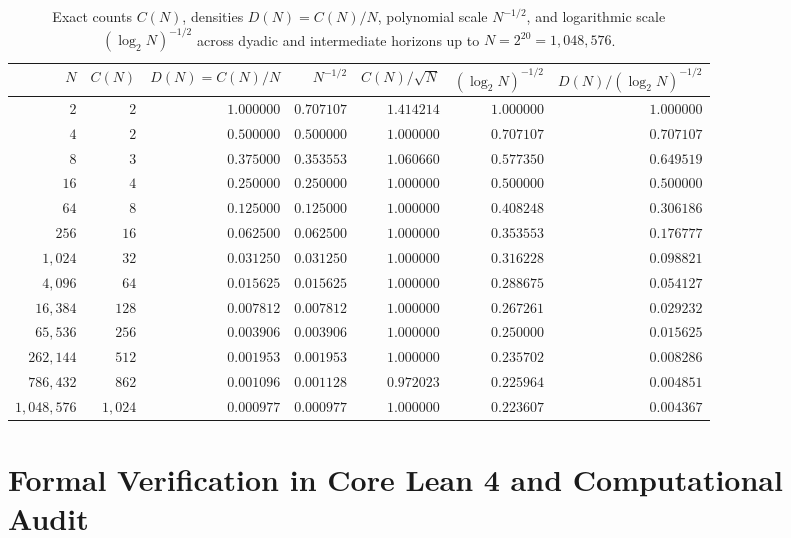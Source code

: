 \documentclass[11pt]{article}
\theoremstyle{definition}
\theoremstyle{remark}
\begin{document}
\begin{table}[htbp]
\centering
\caption{Exact counts $C(N)$, densities $D(N) = C(N)/N$, polynomial scale $N^{-1/2}$, and logarithmic scale $(\log_2 N)^{-1/2}$ across dyadic and intermediate horizons up to $N = 2^{20} = 1{,}048{,}576$.}
\label{tab:numerics}
\vspace{0.4em}
\small
\setlength{\tabcolsep}{5.5pt}
\renewcommand{\arraystretch}{1.15}
\begin{tabular}{rrrrrrr}
\hline
$N$ & $C(N)$ & $D(N) = C(N)/N$ & $N^{-1/2}$ & $C(N)/\sqrt{N}$ & $(\log_2 N)^{-1/2}$ & $D(N)/(\log_2 N)^{-1/2}$ \\
\hline
$2$         & $2$    & $1.000000$ & $0.707107$ & $1.414214$ & $1.000000$ & $1.000000$ \\
$4$         & $2$    & $0.500000$ & $0.500000$ & $1.000000$ & $0.707107$ & $0.707107$ \\
$8$         & $3$    & $0.375000$ & $0.353553$ & $1.060660$ & $0.577350$ & $0.649519$ \\
$16$        & $4$    & $0.250000$ & $0.250000$ & $1.000000$ & $0.500000$ & $0.500000$ \\
$64$        & $8$    & $0.125000$ & $0.125000$ & $1.000000$ & $0.408248$ & $0.306186$ \\
$256$       & $16$   & $0.062500$ & $0.062500$ & $1.000000$ & $0.353553$ & $0.176777$ \\
$1{,}024$   & $32$   & $0.031250$ & $0.031250$ & $1.000000$ & $0.316228$ & $0.098821$ \\
$4{,}096$   & $64$   & $0.015625$ & $0.015625$ & $1.000000$ & $0.288675$ & $0.054127$ \\
$16{,}384$  & $128$  & $0.007812$ & $0.007812$ & $1.000000$ & $0.267261$ & $0.029232$ \\
$65{,}536$  & $256$  & $0.003906$ & $0.003906$ & $1.000000$ & $0.250000$ & $0.015625$ \\
$262{,}144$ & $512$  & $0.001953$ & $0.001953$ & $1.000000$ & $0.235702$ & $0.008286$ \\
$786{,}432$ & $862$  & $0.001096$ & $0.001128$ & $0.972023$ & $0.225964$ & $0.004851$ \\
$1{,}048{,}576$ & $1{,}024$ & $0.000977$ & $0.000977$ & $1.000000$ & $0.223607$ & $0.004367$ \\
\hline
\end{tabular}
\end{table}

\section{Formal Verification in Core Lean 4 and Computational Audit}
\end{document}
